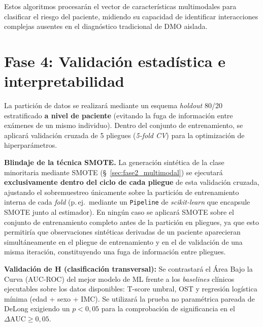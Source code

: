 \documentclass[../tesis.tex]{subfiles}
\begin{document}
Estos algoritmos procesarán el vector de características multimodales para clasificar el riesgo del paciente, midiendo su capacidad de identificar interacciones complejas ausentes en el diagnóstico tradicional de DMO aislada.

\section{Fase 4: Validación estadística e interpretabilidad}
\label{sec:fase5_validacion}

La partición de datos se realizará mediante un esquema \textit{holdout} 80/20 estratificado \textbf{a nivel de paciente} (evitando la fuga de información entre exámenes de un mismo individuo). Dentro del conjunto de entrenamiento, se aplicará validación cruzada de 5 pliegues (\textit{5-fold CV}) para la optimización de hiperparámetros.

\textbf{Blindaje de la técnica SMOTE.} La generación sintética de la clase minoritaria mediante SMOTE (§~\ref{sec:fase2_multimodal}) se ejecutará \textbf{exclusivamente dentro del ciclo de cada pliegue} de esta validación cruzada, ajustando el sobremuestreo únicamente sobre la partición de entrenamiento interna de cada \textit{fold} (p.\,ej.\ mediante un \texttt{Pipeline} de \textit{scikit-learn} que encapsule SMOTE junto al estimador). En ningún caso se aplicará SMOTE sobre el conjunto de entrenamiento completo antes de la partición en pliegues, ya que esto permitiría que observaciones sintéticas derivadas de un paciente aparecieran simultáneamente en el pliegue de entrenamiento y en el de validación de una misma iteración, constituyendo una fuga de información entre pliegues.

\textbf{Validación de H (clasificación transversal):} Se contrastará el Área Bajo la Curva (AUC-ROC) del mejor modelo de ML frente a los \textit{baselines} clínicos ejecutables sobre los datos disponibles: T-score umbral, OST y regresión logística mínima (edad + sexo + IMC). Se utilizará la prueba no paramétrica pareada de DeLong \cite{DeLong1988} exigiendo un $p < 0{,}05$ para la comprobación de significancia en el $\Delta\text{AUC} \geq 0{,}05$.
\end{document}
